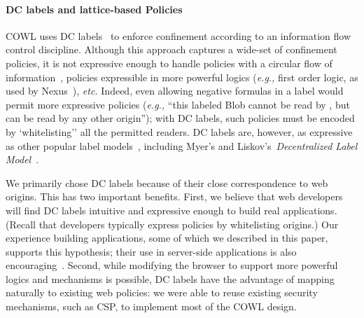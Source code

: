 
%



\paragraph{DC labels and lattice-based Policies}
\label{sec:discussion:lattice}

COWL uses DC labels~\cite{stefan:2011:dclabels} to enforce
confinement according to an information flow control discipline.
%
Although this approach captures a wide-set of confinement policies, it
is not expressive enough to handle policies with a circular flow of
information~\cite{Badger:1995}, policies expressible in
more powerful logics (\emph{e.g.,} first order logic, as used by
Nexus~\cite{sirer2011logical}), \emph{etc.}
%
Indeed, even allowing negative formulas in a label would permit more
expressive policies (\emph{e.g.,} ``this labeled Blob cannot be read by ,
but can be read by any other origin''); with DC labels, such policies must be
encoded by `whitelisting'' all the permitted readers.
%
DC labels are, however, as expressive as other popular label
models~\cite{GenLabels}, including Myer's and
Liskov's~\emph{Decentralized Label Model}~\cite{dlm}.

We primarily chose DC labels because of their close correspondence to
web origins.
%
This has two important benefits.
%
First, we believe that web developers will find DC labels intuitive
and expressive enough to build real applications.
%
(Recall that developers typically express policies by whitelisting
origins.)
%
Our experience building applications, some of which we described in this
paper, supports this hypothesis;
their use in server-side applications is also
encouraging~\cite{giffin:2012:hails, Breeze13, stoughton2014you,
stefan:2011:flexible}.
%
Second, while modifying the browser to support more powerful logics
and mechanisms is possible, DC labels have the advantage of mapping
naturally to existing web policies:
we were able to reuse existing security mechanisms, such as
CSP, to implement most of the COWL design.



